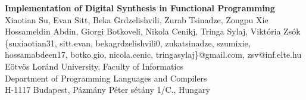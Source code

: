 \documentclass[a0,portrait]{a0poster}
\begin{document}
\newcommand{\sect}[1]{\vspace{3cm}
  {\color{sect}\LARGE\itshape\bfseries #1}\vspace{2cm}}
\newcommand{\ssect}[1]{{\color{custom}\Large\bfseries #1}\vspace{0.6 cm}

}
\newenvironment{sectbox}{
\begin{minipage}[t]{0.45\textwidth}
\addtolength{\parskip}{0.5\baselineskip}
}{
\end{minipage}
}
\vspace{1.0cm}
\begin{center}
{\Huge\bfseries\sffamily\color{custom} {Implementation of Digital Synthesis in Functional Programming}}\\
\vspace{1.5cm}
{\LARGE\color{blackk} Xiaotian Su, Evan Sitt, Beka Grdzelishvili, Zurab Tsinadze, Zongpu Xie}\\{\LARGE\color{blackk} Hossameldin Abdin, Giorgi Botkoveli, Nikola Cenikj, Tringa Sylaj, Vikt\'oria Zs\'ok}\\
\vspace{1.2cm}
{\large\color{blackk} {\{suxiaotian31, sitt.evan, bekagrdzelishvili0, zukatsinadze, szumixie, hossamabdeen17, botko.gio, nicola.cenic,  tringasylaj\}@gmail.com, zsv@inf.elte.hu}}\\
\vspace{1.2cm} %
{\large  \color{blackk}
E\"otv\"os Lor\'and University, Faculty of Informatics\\
Department of Programming Languages and Compilers\\
H-1117 Budapest, P\'azm\'any P\'eter s\'et\'any 1/C., Hungary}\\
\end{center}
\hspace{0.01\textwidth}
\end{document}
